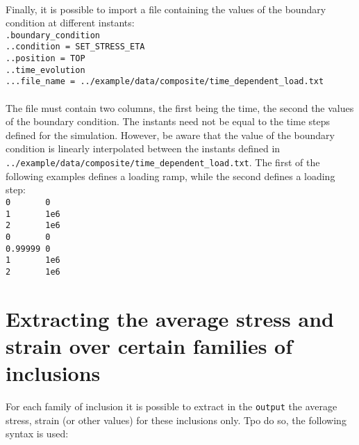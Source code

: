 \documentclass[10pt]{article}
\begin{document}
\paragraph{}Finally, it is possible to import a file containing the values of the boundary condition at different instants:\\

\noindent \verb+.boundary_condition+\\
\verb+..condition = SET_STRESS_ETA+\\
\verb+..position = TOP+\\
\verb+..time_evolution+\\
\verb+...file_name = ../example/data/composite/time_dependent_load.txt+

\paragraph{}The file must contain two columns, the first being the time, the second the values of the boundary condition. The instants need not be equal to the time steps defined for the simulation. However, be aware that the value of the boundary condition is linearly interpolated between the instants defined in \verb+../example/data/composite/time_dependent_load.txt+. The first of the following examples defines a loading ramp, while the second defines a loading step:\\

\noindent \verb+0       0+\\
\verb+1       1e6+\\
\verb+2       1e6+\\

\noindent \verb+0       0+\\
\verb+0.99999 0+\\
\verb+1       1e6+\\
\verb+2       1e6+\\

\section{Extracting the average stress and strain over certain families of inclusions}

For each family of inclusion it is possible to extract in the \verb+output+ the average stress, strain (or other values) for these inclusions only. Tpo do so, the following syntax is used:\\
\end{document}
